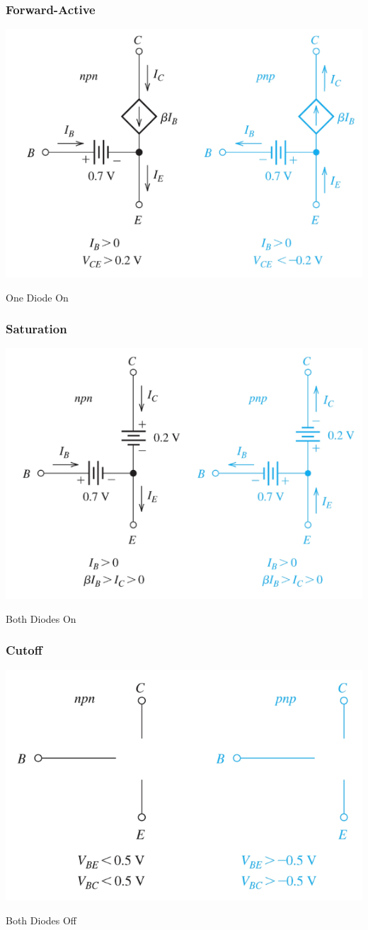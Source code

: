 \documentclass{article}
\begin{document}
\subsubsection*{Forward-Active}
\begin{center}
    \includegraphics[width = .5\textwidth]{LSMforward.png}   
    
    One Diode On
\end{center}
\subsubsection*{Saturation}
\begin{center}
    \includegraphics[width = .5\textwidth]{LSMsaturation.png}   
    
    Both Diodes On
\end{center}
\subsubsection*{Cutoff}
\begin{center}
    \includegraphics[width = .5\textwidth]{LSMcutoff.png}
    
    Both Diodes Off
\end{center}
\end{document}
